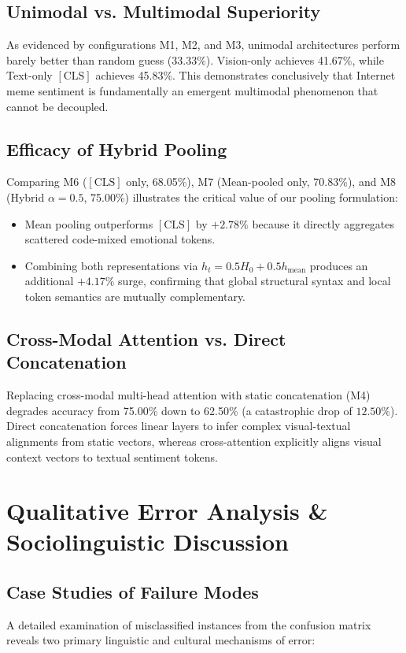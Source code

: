 \documentclass[10pt,journal,compsoc]{IEEEtran}
\begin{document}
\subsection{Unimodal vs. Multimodal Superiority}
As evidenced by configurations M1, M2, and M3, unimodal architectures perform barely better than random guess ($33.33\%$). Vision-only achieves 41.67\%, while Text-only $[\text{CLS}]$ achieves 45.83\%. This demonstrates conclusively that Internet meme sentiment is fundamentally an emergent multimodal phenomenon that cannot be decoupled.

\subsection{Efficacy of Hybrid Pooling}
Comparing M6 ($[\text{CLS}]$ only, 68.05\%), M7 (Mean-pooled only, 70.83\%), and M8 (Hybrid $\alpha=0.5$, 75.00\%) illustrates the critical value of our pooling formulation:
\begin{itemize}
    \item Mean pooling outperforms $[\text{CLS}]$ by $+2.78\%$ because it directly aggregates scattered code-mixed emotional tokens.
    \item Combining both representations via $h_t = 0.5 H_0 + 0.5 h_{\text{mean}}$ produces an additional $+4.17\%$ surge, confirming that global structural syntax and local token semantics are mutually complementary.
\end{itemize}

\subsection{Cross-Modal Attention vs. Direct Concatenation}
Replacing cross-modal multi-head attention with static concatenation (M4) degrades accuracy from 75.00\% down to 62.50\% (a catastrophic drop of $12.50\%$). Direct concatenation forces linear layers to infer complex visual-textual alignments from static vectors, whereas cross-attention explicitly aligns visual context vectors to textual sentiment tokens.

\section{Qualitative Error Analysis \& Sociolinguistic Discussion}
\label{sec:discussion}

\subsection{Case Studies of Failure Modes}
A detailed examination of misclassified instances from the confusion matrix reveals two primary linguistic and cultural mechanisms of error:
\end{document}
